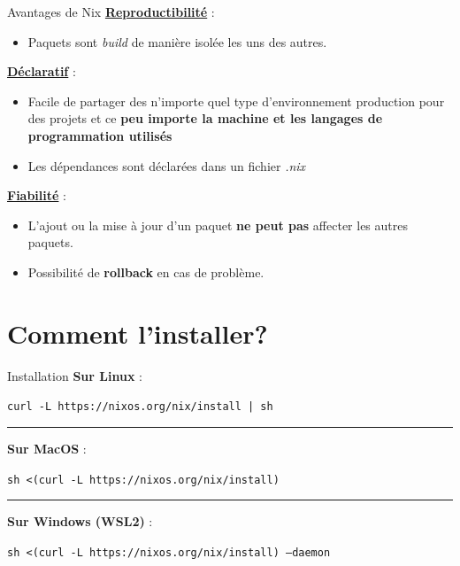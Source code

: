 \documentclass{beamer}
\begin{document}
\begin{frame}{Avantages de Nix}
  \textbf{\underline{Reproductibilité}} :
  \begin{itemize}
    \item Paquets sont \textit{build} de manière isolée les uns des autres.
  \end{itemize}
  \textbf{\underline{Déclaratif}} :
  \begin{itemize}
    \item Facile de partager des n'importe quel type d'environnement
      production pour des projets et ce \textbf{peu importe la machine et les
      langages de programmation utilisés}
    \item Les dépendances sont déclarées dans un fichier \textit{.nix}
  \end{itemize}
  \textbf{\underline{Fiabilité}} :
  \begin{itemize}
    \item L'ajout ou la mise à jour d'un paquet \textbf{ne peut pas} affecter
      les autres paquets. 
    \item Possibilité de \textbf{rollback} en cas de problème.
  \end{itemize}
\end{frame}

\section{Comment l'installer?} 

\begin{frame}{Installation}
  \textbf{Sur Linux} :
  \begin{center}
    \vspace{-0.3cm}
    \texttt{curl -L https://nixos.org/nix/install | sh}
    \vspace{-0.3cm}
  \end{center}
  \rule{\linewidth}{0.6pt}
  \textbf{Sur MacOS} :
  \begin{center}
    \vspace{-0.3cm}
    \texttt{sh <(curl -L https://nixos.org/nix/install)} 
    \vspace{-0.3cm}
  \end{center} 
  \rule{\linewidth}{0.6pt}
  \textbf{Sur Windows (WSL2)} : 
  \begin{center}
    \vspace{-0.3cm}
    \texttt{sh <(curl -L https://nixos.org/nix/install) --daemon} 
    \vspace{-0.3cm}
  \end{center}
\end{frame}
\end{document}
